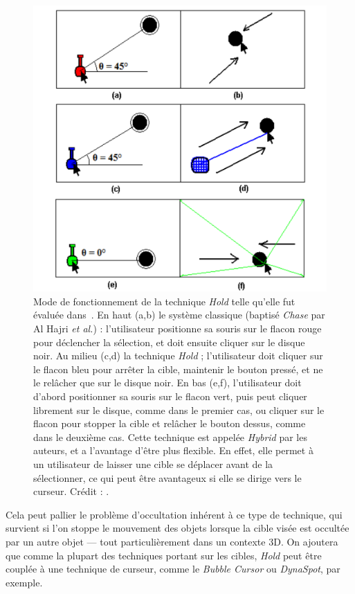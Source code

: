 	\begin{figure}[ht]
		\centering
		\includegraphics[width=\textwidth]{figures/ch2/hold}
		\caption[La technique \emph{Hold}]{Mode de fonctionnement de la technique \emph{Hold} telle qu'elle fut évaluée dans~\cite{hajri2011moving}. En haut (a,b) le système classique (baptisé \emph{Chase} par Al Hajri \emph{et al.}) : l'utilisateur positionne sa souris sur le flacon rouge pour déclencher la sélection, et doit ensuite cliquer sur le disque noir. Au milieu (c,d) la technique \emph{Hold} ; l'utilisateur doit cliquer sur le flacon bleu pour arrêter la cible, maintenir le bouton pressé, et ne le relâcher que sur le disque noir. En bas (e,f), l'utilisateur doit d'abord positionner sa souris sur le flacon vert, puis peut cliquer librement sur le disque, comme dans le premier cas, ou cliquer sur le flacon pour stopper la cible et relâcher le bouton dessus, comme dans le deuxième cas. Cette technique est appelée \emph{Hybrid} par les auteurs, et a l'avantage d'être plus flexible. En effet, elle permet à un utilisateur de laisser une cible se déplacer avant de la sélectionner, ce qui peut être avantageux si elle se dirige vers le curseur. Crédit : \cite{hajri2011moving}.}
		\label{fig:hold}
	\end{figure}
	
	Cela peut pallier le problème d'occultation inhérent à ce type de technique, qui survient si l'on stoppe le mouvement des objets lorsque la cible visée est occultée par un autre objet --- tout particulièrement dans un contexte 3D. On ajoutera que comme la plupart des techniques portant sur les cibles, \emph{Hold} peut être couplée à une technique de curseur, comme le \emph{Bubble Cursor} ou \emph{DynaSpot}, par exemple.
	
